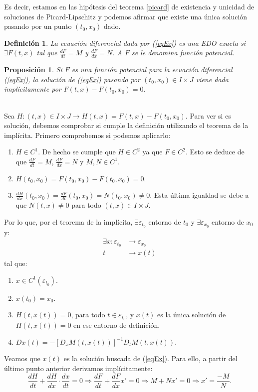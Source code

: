 \documentclass[11pt]{article}
\makeatletter
\newcommand{\iindex}[1]{\emph{#1}\index{#1}}
\theoremstyle{theorem-style}  %
\newtheorem{proposition}[theorem]{Proposición}
\renewenvironment{proof}[1][\proofname]{\par
	\pushQED{\qed}%
	\normalfont \topsep6\p@\@plus6\p@\relax
	\list{}{%
		\settowidth{\leftmargin}{\quad:\hskip\labelsep}%
		\setlength{\labelwidth}{0pt}%
		\setlength{\itemindent}{-\leftmargin}%
	}%
	\item[\hskip\labelsep\itshape#1\@addpunct{:}]\ignorespaces
}{%
	\popQED\endlist\@endpefalse
}
\theoremstyle{definition-style}
\newtheorem{definition}{Definición}[section]
\theoremstyle{example-style}
\makeatother
\begin{document}
	Es decir, estamos en las hipótesis del teorema \ref{picard} de existencia y unicidad de soluciones de Picard-Lipschitz y podemos afirmar que existe una única solución pasando por un punto $ (t_0,x_0) $ dado.
\begin{definition}
	La ecuación diferencial dada por (\ref{eqEx}) es una \iindex{EDO exacta} si $\exists F(t, x)$ tal que $\frac{dF}{dt} = M$ y $\frac{dF}{dx} = N$. A $F$ se le denomina \iindex{función potencial}.
\end{definition}
\begin{proposition} \label{sol_exacta}
	Si $F$ es una función potencial para la ecuación diferencial (\ref{eqEx}), la solución de (\ref{eqEx}) pasando por $(t_0, x_0) \in I \times J$ viene dada implícitamente por $F(t, x) - F(t_0, x_0) = 0$.
\end{proposition}	
\begin{proof}\ \\
	Sea $H:(t, x) \in I \times J \longrightarrow H(t, x) = F(t, x) - F(t_0, x_0)$. Para ver si es solución, debemos comprobar si cumple  la definición utilizando el teorema de la implícita. Primero comprobemos si podemos aplicarlo:
	\begin{enumerate}
		\item $H \in C^1$. De hecho se cumple que $ H\in C^2 $ ya que $F \in C^2$. Esto se deduce de que $\frac{dF}{dt} = M$, $\frac{dF}{dx} = N$ y $M, N \in C^1$.
		\item $H(t_0, x_0) = F(t_0, x_0) - F(t_0, x_0) = 0$.
		\item $\frac{dH}{dx}(t_0, x_0) = \frac{dF}{dt}(t_0, x_0) = N(t_0, x_0) \neq 0$. Esta última igualdad se debe a que $N(t, x) \neq 0$ para todo $(t, x) \in I \times J$.
	\end{enumerate} 
	Por lo que, por el teorema de la implícita, $\exists \varepsilon_{t_0}$ entorno de $t_0$ y $\exists \varepsilon_{x_0}$ entorno de $x_0$ y:
	\begin{align*}
		\exists x : \varepsilon_{t_0} & \longrightarrow \varepsilon_{x_0} \\
		t & \longrightarrow x(t)
	\end{align*}
	tal que:
	\begin{enumerate}
		\item $x \in C^1(\varepsilon_{t_0})$.
		\item $x(t_0) = x_0$.
		\item $H(t, x(t)) = 0$, para todo $ t\in \varepsilon_{t_0} $, y $x(t)$ es la única solución de $H(t, x(t)) = 0$ en ese entorno de definición.
		\item $ D x(t)=-[D_x M(t,x(t))]^{-1}D_tM(t,x(t))$.
	\end{enumerate}
	Veamos que $x(t)$ es la solución buscada de (\ref{eqEx}). Para ello, a partir del último punto anterior derivamos implícitamente:
	\[\frac{dH}{dt} + \frac{dH}{dx} \cdot \frac{dx}{dt} = 0 \Rightarrow \frac{dF}{dt} + \frac{dF}{dx}x' = 0 \Rightarrow M + Nx' = 0 \Rightarrow x' = \frac{-M}{N}.\]
\end{proof}
\end{document}
